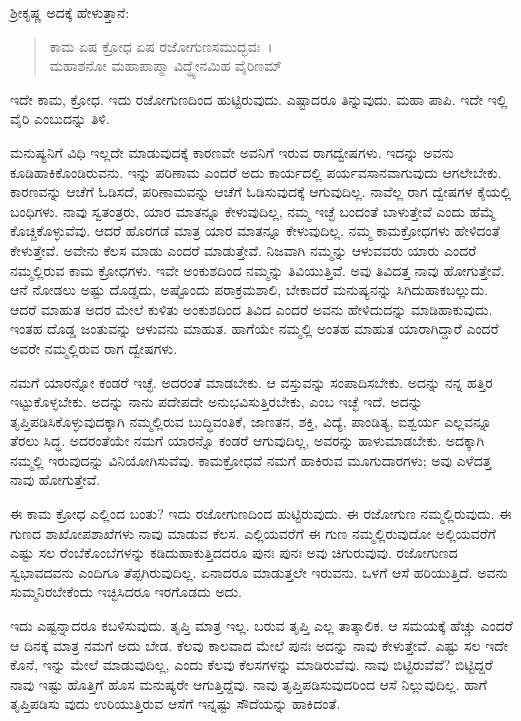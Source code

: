 ಶ‍್ರೀಕೃಷ್ಣ ಅದಕ್ಕೆ ಹೇಳುತ್ತಾನೆ:

\begin{verse}
ಕಾಮ ಏಷ ಕ್ರೋಧ ಏಷ ರಜೋಗುಣಸಮುದ್ಭವಃ~।\\ಮಹಾಶನೋ ಮಹಾಪಾಪ್ಮಾ ವಿದ್ಧ್ಯೇನಮಿಹ ವೈರಿಣಮ್ 
\end{verse}

{\small ಇದೇ ಕಾಮ, ಕ್ರೋಧ. ಇದು ರಜೋಗುಣದಿಂದ ಹುಟ್ಟಿರುವುದು. ಎಷ್ಟಾದರೂ ತಿನ್ನುವುದು. ಮಹಾ ಪಾಪಿ. ಇದೇ ಇಲ್ಲಿ ವೈರಿ ಎಂಬುದನ್ನು ತಿಳಿ.}

ಮನುಷ್ಯನಿಗೆ ವಿಧಿ ಇಲ್ಲದೇ ಮಾಡುವುದಕ್ಕೆ ಕಾರಣವೇ ಅವನಿಗೆ ಇರುವ ರಾಗದ್ವೇಷಗಳು. ಇದನ್ನು ಅವನು ಕೂಡಿಹಾಕಿಕೊಂಡಿರುವನು. ಇನ್ನು ಪರಿಣಾಮ ಎಂದರೆ ಅದು ಕಾರ್ಯದಲ್ಲಿ ಪರ್ಯವಸಾನವಾಗುವುದು ಆಗಲೇಬೇಕು. ಕಾರಣವನ್ನು ಆಚೆಗೆ ಓಡಿಸದೆ, ಪರಿಣಾಮವನ್ನು ಆಚೆಗೆ ಓಡಿಸುವುದಕ್ಕೆ ಆಗುವುದಿಲ್ಲ. ನಾವೆಲ್ಲ ರಾಗ ದ್ವೇಷಗಳ ಕೈಯಲ್ಲಿ ಬಂಧಿಗಳು. ನಾವು ಸ್ವತಂತ್ರರು, ಯಾರ ಮಾತನ್ನೂ ಕೇಳುವುದಿಲ್ಲ, ನಮ್ಮ ಇಚ್ಛೆ ಬಂದಂತೆ ಬಾಳುತ್ತೇವೆ ಎಂದು ಹೆಮ್ಮೆ ಕೊಚ್ಚಿಕೊಳ್ಳುವೆವು. ಆದರೆ ಹೊರಗಡೆ ಮಾತ್ರ ಯಾರ ಮಾತನ್ನೂ ಕೇಳುವುದಿಲ್ಲ. ನಮ್ಮ ಕಾಮಕ್ರೋಧಗಳು ಹೇಳಿದಂತೆ ಕೇಳುತ್ತೇವೆ. ಅವೇನು ಕೆಲಸ ಮಾಡು ಎಂದರೆ ಮಾಡುತ್ತೇವೆ. ನಿಜವಾಗಿ ನಮ್ಮನ್ನು ಆಳುವವರು ಯಾರು ಎಂದರೆ ನಮ್ಮಲ್ಲಿರುವ ಕಾಮ ಕ್ರೋಧಗಳು. ಇವೇ ಅಂಕುಶದಿಂದ ನಮ್ಮನ್ನು ತಿವಿಯುತ್ತಿವೆ. ಅವು ತಿವಿದತ್ತ ನಾವು ಹೋಗುತ್ತೇವೆ. ಆನೆ ನೋಡಲು ಅಷ್ಟು ದೊಡ್ಡದು, ಅಷ್ಟೊಂದು ಪರಾಕ್ರಮಶಾಲಿ, ಬೇಕಾದರೆ ಮನುಷ್ಯನನ್ನು ಸಿಗಿದುಹಾಕಬಲ್ಲುದು. ಆದರೆ ಮಾಹುತ ಅದರ ಮೇಲೆ ಕುಳಿತು ಅಂಕುಶದಿಂದ ತಿವಿದ ಎಂದರೆ ಅವನು ಹೇಳಿದುದನ್ನು ಮಾಡಿಹಾಕುವುದು. ಇಂತಹ ದೊಡ್ಡ ಜಂತುವನ್ನು ಆಳುವನು ಮಾಹುತ. ಹಾಗೆಯೇ ನಮ್ಮಲ್ಲಿ ಅಂತಹ ಮಾಹುತ ಯಾರಾಗಿದ್ದಾರೆ ಎಂದರೆ ಅವರೇ ನಮ್ಮಲ್ಲಿರುವ ರಾಗ ದ್ವೇಷಗಳು.

ನಮಗೆ ಯಾರನ್ನೋ ಕಂಡರೆ ಇಚ್ಛೆ. ಅದರಂತೆ ಮಾಡಬೇಕು. ಆ ವಸ್ತುವನ್ನು ಸಂಪಾದಿಸಬೇಕು. ಅದನ್ನು ನನ್ನ ಹತ್ತಿರ ಇಟ್ಟುಕೊಳ್ಳಬೇಕು. ಅದನ್ನು ನಾನು ಪದೇಪದೇ ಅನುಭವಿಸುತ್ತಿರಬೇಕು, ಎಂಬ ಇಚ್ಛೆ ಇದೆ. ಅದನ್ನು ತೃಪ್ತಿಪಡಿಸಿಕೊಳ್ಳುವುದಕ್ಕಾಗಿ ನಮ್ಮಲ್ಲಿರುವ ಬುದ್ಧಿವಂತಿಕೆ, ಜಾಣತನ, ಶಕ್ತಿ, ವಿದ್ಯೆ, ಪಾಂಡಿತ್ಯ, ಐಶ್ವರ್ಯ ಎಲ್ಲವನ್ನೂ ತೆರಲು ಸಿದ್ಧ. ಅದರಂತೆಯೇ ನಮಗೆ ಯಾರನ್ನೊ ಕಂಡರೆ ಆಗುವುದಿಲ್ಲ, ಅವರನ್ನು ಹಾಳುಮಾಡಬೇಕು. ಅದಕ್ಕಾಗಿ ನಮ್ಮಲ್ಲಿ ಇರುವುದನ್ನು ವಿನಿಯೋಗಿಸುವೆವು. ಕಾಮಕ್ರೋಧವೆ ನಮಗೆ ಹಾಕಿರುವ ಮೂಗುದಾರಗಳು; ಅವು ಎಳೆದತ್ತ ನಾವು ಹೋಗುತ್ತೇವೆ.

ಈ ಕಾಮ ಕ್ರೋಧ ಎಲ್ಲಿಂದ ಬಂತು? ಇದು ರಜೋಗುಣದಿಂದ ಹುಟ್ಟಿರುವುದು. ಈ ರಜೋಗುಣ ನಮ್ಮಲ್ಲಿರುವುದು. ಈ ಗುಣದ ಶಾಖೋಪಶಾಖೆಗಳು ನಾವು ಮಾಡುವ ಕೆಲಸ. ಎಲ್ಲಿಯವರೆಗೆ ಈ ಗುಣ ನಮ್ಮಲ್ಲಿರುವುದೋ ಅಲ್ಲಿಯವರೆಗೆ ಎಷ್ಟು ಸಲ ರೆಂಬೆಕೊಂಬೆಗಳನ್ನು ಕಡಿದುಹಾಕುತ್ತಿದದರೂ ಪುನಃ ಪುನಃ ಅವು ಚಿಗುರುವುವು. ರಜೋಗುಣದ ಸ್ವಭಾವದವನು ಎಂದಿಗೂ ತೆಪ್ಪಗಿರುವುದಿಲ್ಲ. ಏನಾದರೂ ಮಾಡುತ್ತಲೇ ಇರುವನು. ಒಳಗೆ ಆಸೆ ಹರಿಯುತ್ತಿದೆ. ಅವನು ಸುಮ್ಮನಿರಬೇಕೆಂದು ಇಚ್ಛಿಸಿದರೂ ಇರಗೊಡದು ಅದು.

ಇದು ಎಷ್ಟನ್ನಾದರೂ ಕಬಳಿಸುವುದು. ತೃಪ್ತಿ ಮಾತ್ರ ಇಲ್ಲ. ಬರುವ ತೃಪ್ತಿ ಎಲ್ಲ ತಾತ್ಕಾಲಿಕ. ಆ ಸಮಯಕ್ಕೆ ಹೆಚ್ಚು ಎಂದರೆ ಆ ದಿನಕ್ಕೆ ಮಾತ್ರ ನಮಗೆ ಅದು ಬೇಡ. ಕೆಲವು ಕಾಲವಾದ ಮೇಲೆ ಪುನಃ ಅದನ್ನು ನಾವು ಕೇಳುತ್ತೇವೆ. ಎಷ್ಟು ಸಲ ಇದೇ ಕೊನೆ, ಇನ್ನು ಮೇಲೆ ಮಾಡುವುದಿಲ್ಲ, ಎಂದು ಕೆಲವು ಕೆಲಸಗಳನ್ನು ಮಾಡಿರುವೆವು. ನಾವು ಬಿಟ್ಟಿರುವೆವೆ? ಬಿಟ್ಟಿದ್ದರೆ ನಾವು ಇಷ್ಟು ಹೊತ್ತಿಗೆ ಹೊಸ ಮನುಷ್ಯರೇ ಆಗುತ್ತಿದ್ದೆವು. ನಾವು ತೃಪ್ತಿಪಡಿಸುವುದರಿಂದ ಆಸೆ ನಿಲ್ಲುವುದಿಲ್ಲ. ಹಾಗೆ ತೃಪ್ತಿಪಡಿಸು ವುದು ಉರಿಯುತ್ತಿರುವ ಆಸೆಗೆ ಇನ್ನಷ್ಟು ಸೌದೆಯನ್ನು ಹಾಕಿದಂತೆ.

